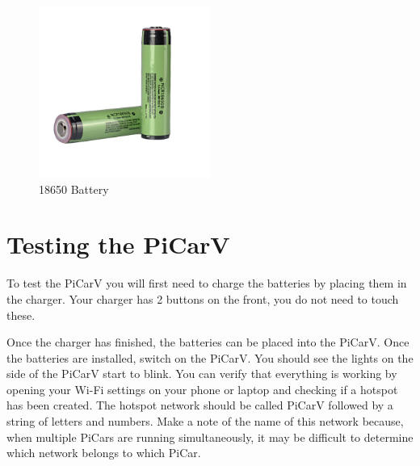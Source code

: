 \documentclass[12pt]{report} %
\begin{document}
\begin {figure}[h]
    \centering
    \includegraphics[width=0.5\textwidth]{battery.png}
    \caption{18650 Battery}
    \label{fig: 18650 Battery}
\end{figure}
    

\section{Testing the PiCarV}
To test the PiCarV you will first need to charge the batteries by placing them in the charger. Your charger has 2 buttons on the front, you do not need to touch these.


Once the charger has finished, the batteries can be placed into the PiCarV. Once the batteries are installed, switch on the PiCarV. You should see the lights on the side of the PiCarV start to blink. You can verify that everything is working by opening your Wi-Fi settings on your phone or laptop and checking if a hotspot has been created. The hotspot network should be called PiCarV followed by a string of letters and numbers. Make a note of the name of this network because, when multiple PiCars are running simultaneously, it may be difficult to determine which network belongs to which PiCar.
\end{document}
